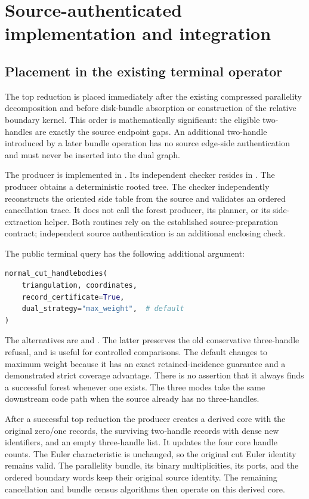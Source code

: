 \section{Source-authenticated implementation and integration}
\label{sec:implementation}

\subsection{Placement in the existing terminal operator}

The top reduction is placed immediately after the existing compressed
parallelity decomposition and before disk-bundle absorption or construction
of the relative boundary kernel. This order is mathematically significant:
the eligible two-handles are exactly the source endpoint gaps. An additional
two-handle introduced by a later bundle operation has no source edge-side
authentication and must never be inserted into the dual graph.

The producer is implemented in .
Its independent checker resides in .
The producer obtains a deterministic rooted tree. The checker independently
reconstructs the oriented side table from the source and validates an ordered
cancellation trace. It does not call the forest producer, its planner, or its
side-extraction helper. Both routines rely on the established source-preparation
contract; independent source authentication is an additional enclosing check.

The public terminal query has the following additional argument:
\begin{lstlisting}[language=Python]
normal_cut_handlebodies(
    triangulation, coordinates,
    record_certificate=True,
    dual_strategy="max_weight",  # default
)
\end{lstlisting}
The alternatives are  and . The latter preserves
the old conservative three-handle refusal, and is useful for controlled
comparisons. The default changes to maximum weight because it has an exact
retained-incidence guarantee and a demonstrated strict coverage advantage.
There is no assertion that it always finds a successful forest whenever one
exists. The three modes take the same downstream code path when the source
already has no three-handles.

After a successful top reduction the producer creates a derived core with
the original zero/one records, the surviving two-handle records with dense
new identifiers, and an empty three-handle list. It updates the four core
handle counts. The Euler characteristic is unchanged, so the original cut
Euler identity remains valid. The parallelity bundle, its binary
multiplicities, its ports, and the ordered boundary words keep their original
source identity. The remaining cancellation and bundle census algorithms
then operate on this derived core.


